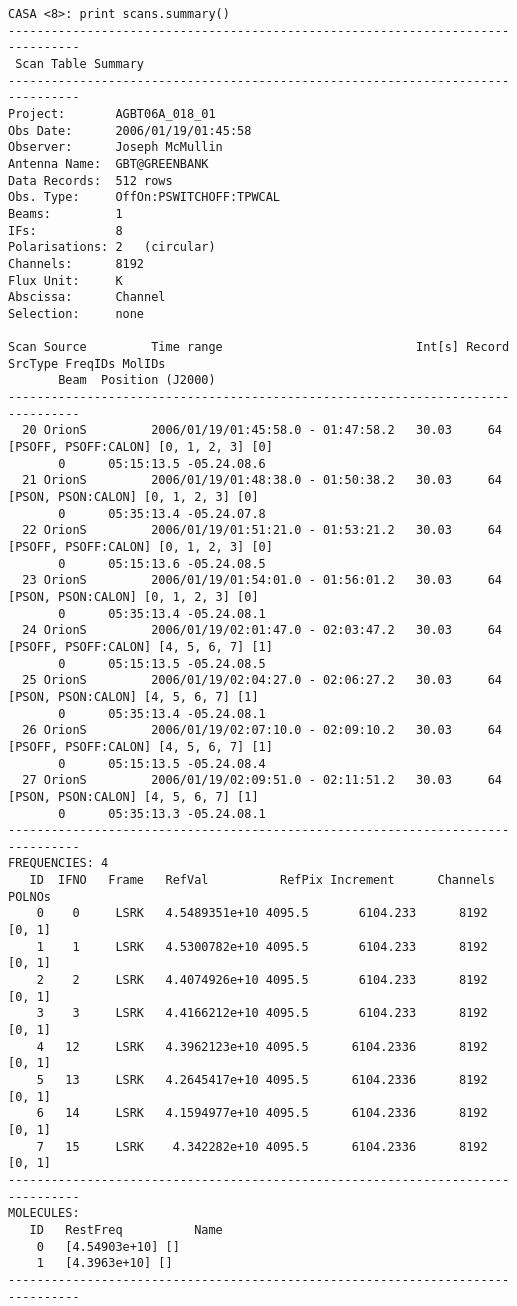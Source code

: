 \footnotesize
\begin{verbatim}
CASA <8>: print scans.summary()
--------------------------------------------------------------------------------
 Scan Table Summary
--------------------------------------------------------------------------------
Project:       AGBT06A_018_01
Obs Date:      2006/01/19/01:45:58
Observer:      Joseph McMullin
Antenna Name:  GBT@GREENBANK
Data Records:  512 rows
Obs. Type:     OffOn:PSWITCHOFF:TPWCAL
Beams:         1   
IFs:           8   
Polarisations: 2   (circular)
Channels:      8192
Flux Unit:     K
Abscissa:      Channel
Selection:     none

Scan Source         Time range                           Int[s] Record SrcType FreqIDs MolIDs 
       Beam  Position (J2000)       
--------------------------------------------------------------------------------
  20 OrionS         2006/01/19/01:45:58.0 - 01:47:58.2   30.03     64  [PSOFF, PSOFF:CALON] [0, 1, 2, 3] [0]
       0      05:15:13.5 -05.24.08.6
  21 OrionS         2006/01/19/01:48:38.0 - 01:50:38.2   30.03     64  [PSON, PSON:CALON] [0, 1, 2, 3] [0]
       0      05:35:13.4 -05.24.07.8
  22 OrionS         2006/01/19/01:51:21.0 - 01:53:21.2   30.03     64  [PSOFF, PSOFF:CALON] [0, 1, 2, 3] [0]
       0      05:15:13.6 -05.24.08.5
  23 OrionS         2006/01/19/01:54:01.0 - 01:56:01.2   30.03     64  [PSON, PSON:CALON] [0, 1, 2, 3] [0]
       0      05:35:13.4 -05.24.08.1
  24 OrionS         2006/01/19/02:01:47.0 - 02:03:47.2   30.03     64  [PSOFF, PSOFF:CALON] [4, 5, 6, 7] [1]
       0      05:15:13.5 -05.24.08.5
  25 OrionS         2006/01/19/02:04:27.0 - 02:06:27.2   30.03     64  [PSON, PSON:CALON] [4, 5, 6, 7] [1]
       0      05:35:13.4 -05.24.08.1
  26 OrionS         2006/01/19/02:07:10.0 - 02:09:10.2   30.03     64  [PSOFF, PSOFF:CALON] [4, 5, 6, 7] [1]
       0      05:15:13.5 -05.24.08.4
  27 OrionS         2006/01/19/02:09:51.0 - 02:11:51.2   30.03     64  [PSON, PSON:CALON] [4, 5, 6, 7] [1]
       0      05:35:13.3 -05.24.08.1
--------------------------------------------------------------------------------
FREQUENCIES: 4
   ID  IFNO   Frame   RefVal          RefPix Increment      Channels POLNOs
    0    0     LSRK   4.5489351e+10 4095.5       6104.233      8192  [0, 1]
    1    1     LSRK   4.5300782e+10 4095.5       6104.233      8192  [0, 1]
    2    2     LSRK   4.4074926e+10 4095.5       6104.233      8192  [0, 1]
    3    3     LSRK   4.4166212e+10 4095.5       6104.233      8192  [0, 1]
    4   12     LSRK   4.3962123e+10 4095.5      6104.2336      8192  [0, 1]
    5   13     LSRK   4.2645417e+10 4095.5      6104.2336      8192  [0, 1]
    6   14     LSRK   4.1594977e+10 4095.5      6104.2336      8192  [0, 1]
    7   15     LSRK    4.342282e+10 4095.5      6104.2336      8192  [0, 1]
--------------------------------------------------------------------------------
MOLECULES: 
   ID   RestFreq          Name           
    0   [4.54903e+10] []
    1   [4.3963e+10] []
--------------------------------------------------------------------------------
\end{verbatim}
\normalsize

